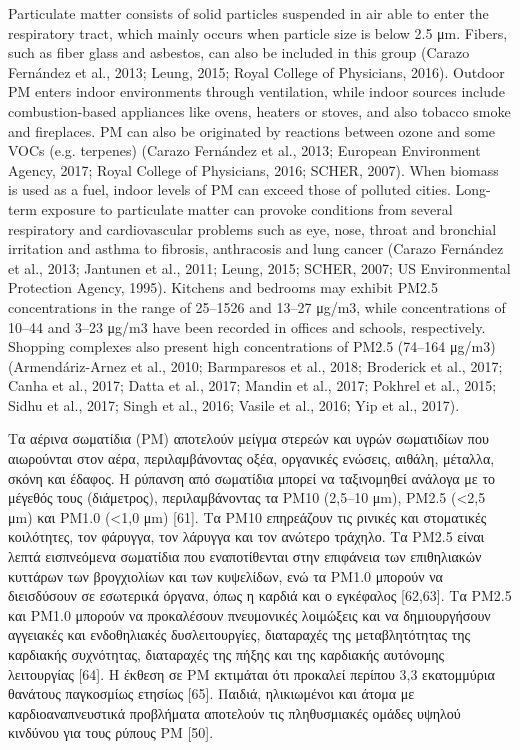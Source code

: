 Particulate matter consists of solid particles suspended in air able to enter the respiratory tract, which mainly occurs when particle size is below 2.5 μm. Fibers, such as fiber glass and asbestos, can also be included in this group (Carazo Fernández et al., 2013; Leung, 2015; Royal College of Physicians, 2016). Outdoor PM enters indoor environments through ventilation, while indoor sources include combustion-based appliances like ovens, heaters or stoves, and also tobacco smoke and fireplaces. PM can also be originated by reactions between ozone and some VOCs (e.g. terpenes) (Carazo Fernández et al., 2013; European Environment Agency, 2017; Royal College of Physicians, 2016; SCHER, 2007). When biomass is used as a fuel, indoor levels of PM can exceed those of polluted cities. Long-term exposure to particulate matter can provoke conditions from several respiratory and cardiovascular problems such as eye, nose, throat and bronchial irritation and asthma to fibrosis, anthracosis and lung cancer (Carazo Fernández et al., 2013; Jantunen et al., 2011; Leung, 2015; SCHER, 2007; US Environmental Protection Agency, 1995). Kitchens and bedrooms may exhibit PM2.5 concentrations in the range of 25–1526 and 13–27 μg/m3, while concentrations of 10–44 and 3–23 μg/m3 have been recorded in offices and schools, respectively. Shopping complexes also present high concentrations of PM2.5 (74–164 μg/m3) (Armendáriz-Arnez et al., 2010; Barmparesos et al., 2018; Broderick et al., 2017; Canha et al., 2017; Datta et al., 2017; Mandin et al., 2017; Pokhrel et al., 2015; Sidhu et al., 2017; Singh et al., 2016; Vasile et al., 2016; Yip et al., 2017).



\cite{GONZALEZMARTIN2021128376}

Τα αέρινα σωματίδια (PM) αποτελούν μείγμα στερεών και υγρών σωματιδίων που αιωρούνται στον αέρα, περιλαμβάνοντας οξέα, οργανικές ενώσεις, αιθάλη, μέταλλα, σκόνη και έδαφος. Η ρύπανση από σωματίδια μπορεί να ταξινομηθεί ανάλογα με το μέγεθός τους (διάμετρος), περιλαμβάνοντας τα PM10 (2,5–10 μm), PM2.5 (<2,5 μm) και PM1.0 (<1,0 μm) [61]. Τα PM10 επηρεάζουν τις ρινικές και στοματικές κοιλότητες, τον φάρυγγα, τον λάρυγγα και τον ανώτερο τράχηλο. Τα PM2.5 είναι λεπτά εισπνεόμενα σωματίδια που εναποτίθενται στην επιφάνεια των επιθηλιακών κυττάρων των βρογχιολίων και των κυψελίδων, ενώ τα PM1.0 μπορούν να διεισδύσουν σε εσωτερικά όργανα, όπως η καρδιά και ο εγκέφαλος [62,63]. Τα PM2.5 και PM1.0 μπορούν να προκαλέσουν πνευμονικές λοιμώξεις και να δημιουργήσουν αγγειακές και ενδοθηλιακές δυσλειτουργίες, διαταραχές της μεταβλητότητας της καρδιακής συχνότητας, διαταραχές της πήξης και της καρδιακής αυτόνομης λειτουργίας [64]. Η έκθεση σε PM εκτιμάται ότι προκαλεί περίπου 3,3 εκατομμύρια θανάτους παγκοσμίως ετησίως [65]. Παιδιά, ηλικιωμένοι και άτομα με καρδιοαναπνευστικά προβλήματα αποτελούν τις πληθυσμιακές ομάδες υψηλού κινδύνου για τους ρύπους PM [50].

